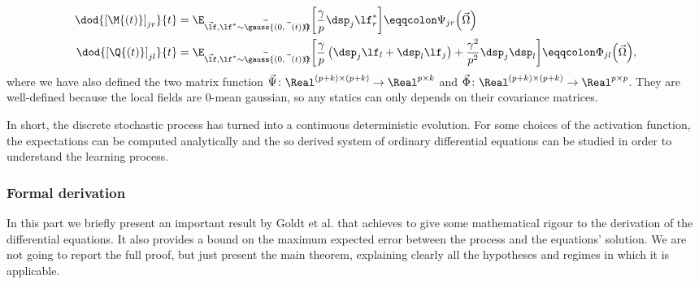 \begin{subequations}\label{eq:genericODE}\begin{align}
  \label{eq:genericODEforM}
  \dod{\left[\M{\left(t\right)}\right]_{jr}}{t} &=\E_{\vec{\lf},\vec{\lf^* \sim \gauss{(0,\vec{\Omega}{(t)})}}}{\left[\frac{\gamma}{p} \dsp_j \lf_r^*\right]} \eqqcolon \Psi_{jr}{\left(\vec{\Omega}\right)}\\
  \label{eq:genericODEforQ}
  \dod{\left[\Q{\left(t\right)}\right]_{jl}}{t} &=\E_{\vec{\lf},\vec{\lf^* \sim \gauss{(0,\vec{\Omega}{(t)})}}}{\left[\frac{\gamma}{p}\left(\dsp_j \lf_l + \dsp_l \lf_j\right) + \frac{\gamma^2}{p^2} \dsp_j\dsp_l\right]} \eqqcolon \Phi_{jl}{\left(\vec{\Omega}\right)},
\end{align}\end{subequations}
where we have also defined the two matrix function \(\vec{\Psi}\colon\Real^{(p+k)\times(p+k)} \to\Real^{p\times k}\) and 
\(\vec{\Phi}\colon\Real^{(p+k)\times(p+k)} \to\Real^{p\times p}\).
They are well-defined because the local fields are 0-mean gaussian, so any statics
can only depends on their covariance matrices.

In short, the discrete stochastic process has turned into a continuous deterministic evolution.
For some choices of the activation function, the expectations can be computed analytically and
the so derived system of ordinary differential equations can be studied in order
to understand the learning process.

\subsubsection{Formal derivation}
In this part we briefly present an important result by Goldt et al.\cite{goldt2019dynamics}
that achieves to give some mathematical rigour to the derivation of the differential
equations. It also provides a bound on the maximum expected error between the process
and the equations' solution. We are not going to report the full proof, but just 
present the main theorem, explaining clearly all the hypotheses and regimes in which
it is applicable.

